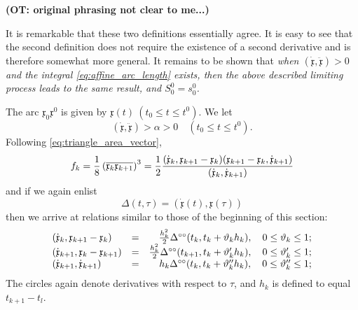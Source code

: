 \documentclass[11pt]{book} \usepackage{amssymb}
\newcommand{\myvec}[1]{\mathfrak{#1}}
\newcommand{\vecx}{\myvec{x}}
\newcommand{\vecderiv}[1]{\dot{\myvec{#1}}}
\newcommand{\vecderivv}[1]{\ddot{\myvec{#1}}}
\begin{document}
{\bf (OT: original phrasing not clear to me...)}

It is remarkable that these two definitions essentially agree. It is easy to
see that the second definition does not require the existence of a second
derivative and is therefore somewhat more general. It remains to be shown that
{\em when $(\vecderiv{x},\vecderivv{x})>0$ and the integral 
  \eqref{eq:affine_arc_length} exists, then the above described limiting 
  process leads to the same result, and $S_0^0=s_0^0$.}

The arc $\vecx_0\vecx^0$ is given by $\vecx(t)\:(t_0\leq t \leq t^0)$. We let
\begin{equation}
  \label{eq:bound_curvature}
  (\vecderiv{x},\vecderivv{x})>\alpha>0 \quad (t_0\leq t \leq t^0).
\end{equation}
Following \eqref{eq:triangle_area_vector},
\begin{equation}
  \label{eq:kth_segment_len}
  f_k={1\over 8}\left(\overline{\vecx_k\vecx_{k+1}}\right)^3
  = {1 \over 2}
  { (\vecderiv{x}_k,\vecx_{k+1}-\vecx_k)
    (\vecx_{k+1}-\vecx_k,\vecderiv{x}_{k+1})
    \over
    (\vecderiv{x}_k,\vecderiv{x}_{k+1})
  }
\end{equation}
and if we again enlist
\begin{equation}
  \label{eq:delta}
  \Delta(t,\tau)=(\vecderiv{x}(t),\vecx(\tau))
\end{equation}
then we arrive at relations similar to those of the beginning of this section:
\begin{equation}
  \label{eq:delta_relations}
  \begin{array}{lcr}
    (\vecderiv{x}_k,\vecx_{k+1}-\vecx_k)&=&{h_k^2\over 2}\Delta^{\circ\circ}(t_k,t_k+\vartheta_kh_k),\quad 0\leq \vartheta_k\leq 1;\\
    (\vecderiv{x}_{k+1},\vecx_k-\vecx_{k+1})&=&{h_k^2\over 2}\Delta^{\circ\circ}(t_{k+1},t_k+\vartheta'_kh_k),\quad 0\leq \vartheta'_k\leq 1;\\
    (\vecderiv{x}_{k+1},\vecderiv{x}_{k+1})&=&h_k\Delta^{\circ\circ}(t_k,t_k+\vartheta''_kh_k),\quad 0\leq \vartheta''_k\leq 1;
  \end{array}
\end{equation}
The circles again denote derivatives with respect to $\tau$, and $h_k$ is
defined to equal $t_{k+1}-t_l$.
\end{document}
